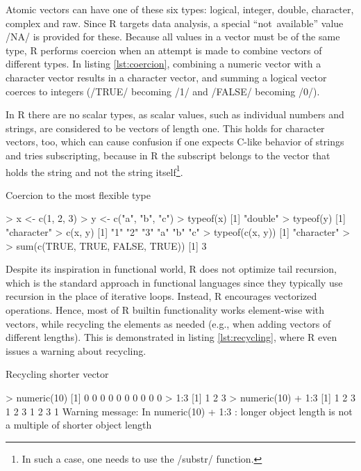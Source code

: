 {Atomic vectors can have one of these six types: logical, integer, double, character, complex and raw. Since R targets data analysis, a special ``not~available'' value \rinline/NA/ is provided for these. Because all values in a vector must be of the same type, R performs coercion when an attempt is made to combine vectors of different types. In listing \ref{lst:coercion}, combining a numeric vector with a character vector results in a character vector, and summing a logical vector coerces to integers (\rinline/TRUE/ becoming \rinline/1/ and \rinline/FALSE/ becoming \rinline/0/).

In R there are no scalar types, as scalar values, such as individual numbers and strings, are considered to be vectors of length one. This holds for character vectors, too, which can cause confusion if one expects C-like behavior of strings and tries subscripting, because in R the subscript belongs to the vector that holds the string and not the string itself\footnote{In such a case, one needs to use the \rinline/substr/ function.}.

\begin{listing}[htbp]
  \caption{\label{lst:coercion}Coercion to the most flexible type}
  \begin{rcode}
> x <- c(1, 2, 3)
> y <- c("a", "b", "c")
> typeof(x)
[1] "double"
> typeof(y)
[1] "character"
> c(x, y)
[1] "1" "2" "3" "a" "b" "c"
> typeof(c(x, y))
[1] "character"
>
> sum(c(TRUE, TRUE, FALSE, TRUE))
[1] 3
  \end{rcode}
\end{listing}

Despite its inspiration in functional world, R does not optimize tail recursion, which is the standard approach in functional languages since they typically use recursion in the place of iterative loops. Instead, R encourages vectorized operations. Hence, most of R builtin functionality works element-wise with vectors, while recycling the elements as needed (e.g., when adding vectors of different lengths). This is demonstrated in listing \ref{lst:recycling}, where R even issues a warning about recycling.

\begin{listing}[htbp]
  \caption{\label{lst:recycling}Recycling shorter vector}
  \begin{rcode}
> numeric(10)
 [1] 0 0 0 0 0 0 0 0 0 0
> 1:3
[1] 1 2 3
> numeric(10) + 1:3
 [1] 1 2 3 1 2 3 1 2 3 1
Warning message:
In numeric(10) + 1:3 :
  longer object length is not a multiple of shorter object length
  \end{rcode}
\end{listing}

}

